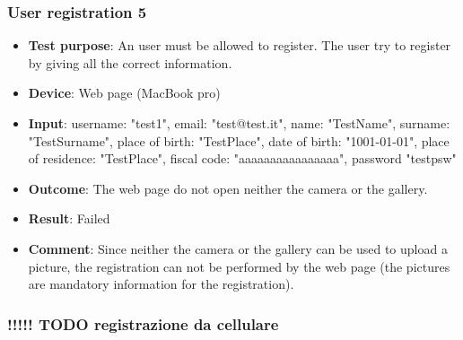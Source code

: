 \documentclass[../ATD.tex]{subfiles}
\begin{document}
    \subsubsection{User registration 5}\label{subsubsec:user-registration-5}
    \begin{itemize}
        \item \textbf{Test purpose}: An user must be allowed to register.
        The user try to register by giving all the correct information.
        \item \textbf{Device}: Web page (MacBook pro)
        \item \textbf{Input}: username: "test1", email: "test@test.it", name: "TestName", surname: "TestSurname", place of birth: "TestPlace", date of birth: "1001-01-01", place of residence: "TestPlace", fiscal code: "aaaaaaaaaaaaaaaa", password "testpsw"
        \item \textbf{Outcome}: The web page do not open neither the camera or the gallery.
        \item \textbf{Result}: Failed
        \item \textbf{Comment}: Since neither the camera or the gallery can be used to upload a picture, the registration can not be performed by the web page (the pictures are mandatory information for the registration).
    \end{itemize}

    \subsubsection{ !!!!! TODO registrazione da cellulare}\label{subsubsec:user-registration-6}
    \begin{itemize}
    \end{itemize}
\end{document}
